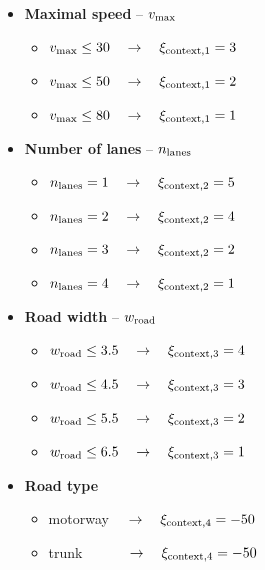             \begin{itemize}
                \item \textbf{Maximal speed} -- $v_{\rm{max}}$
                    \begin{itemize}
                        \item $v_{\rm{max}}\leq30\quad\to\quad\xi_{\rm{context,1}}=3$
                        \item $v_{\rm{max}}\leq50\quad\to\quad\xi_{\rm{context,1}}=2$
                        \item $v_{\rm{max}}\leq80\quad\to\quad\xi_{\rm{context,1}}=1$
                    \end{itemize}
                \item \textbf{Number of lanes} -- $n_{\rm{lanes}}$
                    \begin{itemize}
                        \item $n_{\rm{lanes}}=1\quad\to\quad\xi_{\rm{context,2}}=5$
                        \item $n_{\rm{lanes}}=2\quad\to\quad\xi_{\rm{context,2}}=4$
                        \item $n_{\rm{lanes}}=3\quad\to\quad\xi_{\rm{context,2}}=2$
                        \item $n_{\rm{lanes}}=4\quad\to\quad\xi_{\rm{context,2}}=1$
                    \end{itemize}
                \item \textbf{Road width} -- $w_{\rm{road}}$
                    \begin{itemize}
                        \item $w_{\rm{road}}\leq3.5\quad\to\quad\xi_{\rm{context,3}}=4$
                        \item $w_{\rm{road}}\leq4.5\quad\to\quad\xi_{\rm{context,3}}=3$
                        \item $w_{\rm{road}}\leq5.5\quad\to\quad\xi_{\rm{context,3}}=2$
                        \item $w_{\rm{road}}\leq6.5\quad\to\quad\xi_{\rm{context,3}}=1$
                    \end{itemize}
                \item \textbf{Road type}
                    \begin{itemize}
                        \item motorway $\quad\to\quad\xi_{\rm{context,4}}=-50$
                        \item trunk $\quad\qquad\to\quad\xi_{\rm{context,4}}=-50$

\end{itemize}
\end{itemize}
